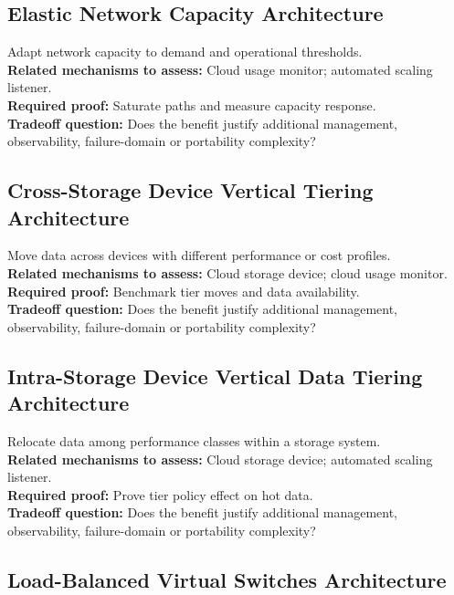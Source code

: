 \documentclass[10pt,letterpaper]{article}
\begin{document}
\subsection{Elastic Network Capacity Architecture}
Adapt network capacity to demand and operational thresholds.\\[3pt]
\textbf{Related mechanisms to assess:} Cloud usage monitor; automated scaling listener.\\[3pt]
\textbf{Required proof:} Saturate paths and measure capacity response.\\[3pt]
\textbf{Tradeoff question:} Does the benefit justify additional management, observability, failure-domain or portability complexity?\\[3pt]
\subsection{Cross-Storage Device Vertical Tiering Architecture}
Move data across devices with different performance or cost profiles.\\[3pt]
\textbf{Related mechanisms to assess:} Cloud storage device; cloud usage monitor.\\[3pt]
\textbf{Required proof:} Benchmark tier moves and data availability.\\[3pt]
\textbf{Tradeoff question:} Does the benefit justify additional management, observability, failure-domain or portability complexity?\\[3pt]
\subsection{Intra-Storage Device Vertical Data Tiering Architecture}
Relocate data among performance classes within a storage system.\\[3pt]
\textbf{Related mechanisms to assess:} Cloud storage device; automated scaling listener.\\[3pt]
\textbf{Required proof:} Prove tier policy effect on hot data.\\[3pt]
\textbf{Tradeoff question:} Does the benefit justify additional management, observability, failure-domain or portability complexity?\\[3pt]
\subsection{Load-Balanced Virtual Switches Architecture}
\end{document}
